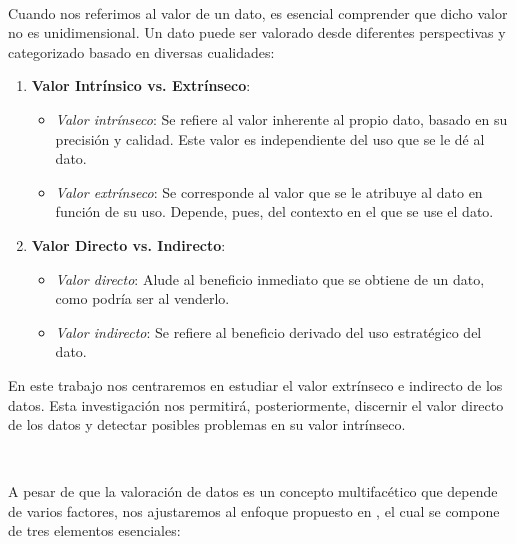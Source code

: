 \

Cuando nos referimos al valor de un dato, es esencial
comprender que dicho valor no es unidimensional. Un dato
puede ser valorado desde diferentes perspectivas y
categorizado basado en diversas cualidades:

\begin{enumerate}
  \item \textbf{Valor Intrínsico vs. Extrínseco}:
  \begin{itemize}
    \item \emph{Valor intrínseco}: Se refiere al valor
    inherente al propio dato, basado en su precisión y calidad.
    Este valor es independiente del uso que se le dé al dato.

    \item \emph{Valor extrínseco}: Se corresponde al valor
    que se le atribuye al dato en función de su uso.
    Depende, pues, del contexto en el que se use el dato.
  \end{itemize}

  \item \textbf{Valor Directo vs. Indirecto}:
  \begin{itemize}
    \item \emph{Valor directo}: Alude al beneficio
    inmediato que se obtiene de un dato, como podría ser
    al venderlo.

    \item \emph{Valor indirecto}: Se refiere al
    beneficio derivado del uso estratégico del dato.
  \end{itemize}
\end{enumerate}

En este trabajo nos centraremos en estudiar el valor extrínseco
e indirecto de los datos. Esta investigación nos permitirá,
posteriormente, discernir el valor directo de los datos y
detectar posibles problemas en su valor intrínseco.

\

A pesar de que la valoración de datos es un concepto
multifacético que depende de varios factores, nos
ajustaremos al enfoque propuesto en \cite{dataShapley,betaShapley},
el cual se compone de tres elementos esenciales:

